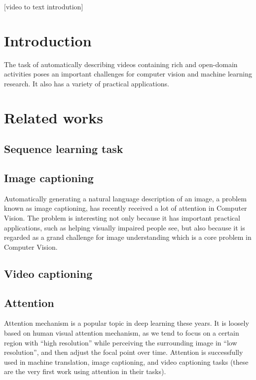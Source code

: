 




\tableofcontents
\clearpage

\begin{abstract}

\end{abstract}
[video to text introdution]
\section{Introduction}
The task of automatically describing videos containing
rich and open-domain activities poses an important challenges
for computer vision and machine learning research.
It also has a variety of practical applications.

\section{Related works}
\subsection{Sequence learning task}

\subsection{Image captioning}
Automatically generating a natural language description of an image, a problem known as image captioning, has recently received a lot of attention in Computer Vision. The problem is interesting not only because it has important practical applications, such as helping visually impaired people see, but also because it is regarded as a grand challenge for image understanding which is a core problem in Computer Vision.

\subsection{Video captioning}


\subsection{Attention}
Attention mechanism is a popular topic in deep learning these years. It is loosely based on human visual attention mechanism, as we tend to focus on a certain region with “high resolution” while perceiving the surrounding image in “low resolution”, and then adjust the focal point over time. Attention is successfully used in machine translation\cite{bahdanau2014neural}, image captioning\cite{xu2015show}, and video captioning\cite{venugopalan2014translating} tasks (these are the very first work using attention in their tasks).

